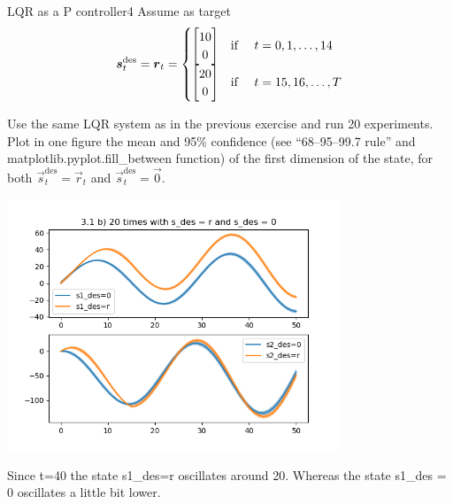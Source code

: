\begin{questions}
\begin{question}{LQR as a P controller}{4}
	Assume as target 
	\begin{align}
        \vec s^\text{des}_t = \vec r_t = \begin{cases}
        \begin{bmatrix}
        10\\
        0
        \end{bmatrix}  & \text{if \quad} t=0,1,\ldots,14
        \\
        \begin{bmatrix}
        20\\
        0
        \end{bmatrix}  & \text{if \quad} t=15,16,\ldots,T
        \end{cases}	
	\end{align}
    
    Use the same LQR system as in the previous exercise and run 20 experiments. Plot in one figure the mean and 95\% confidence (see ``68--95--99.7 rule'' and matplotlib.pyplot.fill\_between function) of the first dimension of the state, for both $\vec s^\text{des}_t = \vec r_t$ and $\vec s^\text{des}_t = \vec 0$.
\end{question}

\begin{answer}
\begin{center}
	\includegraphics[width=0.75\textwidth]{img/1b_20.png}
\end{center}

Since t=40 the state s1\_des=r oscillates around 20. Whereas the state s1\_des = 0 oscillates a little bit lower.
	
\end{answer}



\end{questions}
